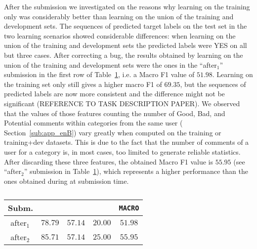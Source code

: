 After the submission we investigated on the reasons why learning on the training 
only was considerably better than learning on the union of the training and 
development sets. 
The sequences of predicted target labels on the test set in the two learning 
scenarios showed considerable differences: when learning on the union of the 
training and development sets the predicted labels were YES on all but three 
cases. 
After correcting a bug, the results obtained by learning on the union of the 
training and development sets were the ones in the ``after$_1$'' submission in 
the first row of Table~\ref{tab:aftertaskb}, i.e.  
a Macro F1 value of $51.98$. Learning on the training set only still gives a 
higher macro F1 of $69.35$, but the sequences of predicted labels are now more 
consistent and the difference might not be significant (REFERENCE TO TASK 
DESCRIPTION PAPER). 
We observed that the values of those features counting the number of Good, Bad, 
and Potential comments within categories from the same user (\cf 
Section~\ref{sub:app_enB}) vary greatly when computed on the training or 
training+dev datasets. 
This is due to the fact that the number of comments of a user for a category is, 
in most cases, too limited to generate reliable statistics. 
After discarding these three features, the obtained Macro F1 value is $55.95$ 
(see ``after$_2$'' submission in Table~\ref{tab:aftertaskb}), which represents a 
higher performance than the ones obtained during at submission time.

\begin{table}%
\begin{tabular}{|l|cccc|}
\hline  
 Subm.		& \bf \yes & \bf \no & \bf \unsure & \bf \texttt{MACRO}	 \\
  \hline
  \,\,after$_1$	& $78.79$	& $57.14$	& $20.00$	& $51.98$ \\
  \,\,after$_2$ & $85.71$	& $57.14$	& $25.00$ 	& $55.95$ \\
  \hline
 \end{tabular}
 \caption{\label{tab:aftertaskb}}
 \end{table}